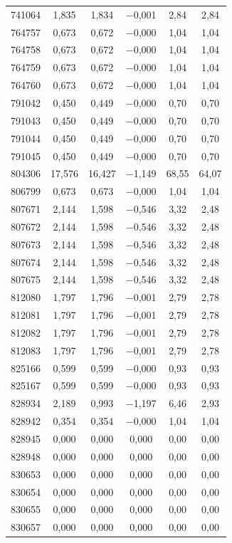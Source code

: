 \begin{longtable}{lccccc}
741064 & 1,835 & 1,834 & $-$0,001 & 2,84 & 2,84 \\
764757 & 0,673 & 0,672 & $-$0,000 & 1,04 & 1,04 \\
764758 & 0,673 & 0,672 & $-$0,000 & 1,04 & 1,04 \\
764759 & 0,673 & 0,672 & $-$0,000 & 1,04 & 1,04 \\
764760 & 0,673 & 0,672 & $-$0,000 & 1,04 & 1,04 \\
791042 & 0,450 & 0,449 & $-$0,000 & 0,70 & 0,70 \\
791043 & 0,450 & 0,449 & $-$0,000 & 0,70 & 0,70 \\
791044 & 0,450 & 0,449 & $-$0,000 & 0,70 & 0,70 \\
791045 & 0,450 & 0,449 & $-$0,000 & 0,70 & 0,70 \\
804306 & 17,576 & 16,427 & $-$1,149 & 68,55 & 64,07 \\
806799 & 0,673 & 0,673 & $-$0,000 & 1,04 & 1,04 \\
807671 & 2,144 & 1,598 & $-$0,546 & 3,32 & 2,48 \\
807672 & 2,144 & 1,598 & $-$0,546 & 3,32 & 2,48 \\
807673 & 2,144 & 1,598 & $-$0,546 & 3,32 & 2,48 \\
807674 & 2,144 & 1,598 & $-$0,546 & 3,32 & 2,48 \\
807675 & 2,144 & 1,598 & $-$0,546 & 3,32 & 2,48 \\
812080 & 1,797 & 1,796 & $-$0,001 & 2,79 & 2,78 \\
812081 & 1,797 & 1,796 & $-$0,001 & 2,79 & 2,78 \\
812082 & 1,797 & 1,796 & $-$0,001 & 2,79 & 2,78 \\
812083 & 1,797 & 1,796 & $-$0,001 & 2,79 & 2,78 \\
825166 & 0,599 & 0,599 & $-$0,000 & 0,93 & 0,93 \\
825167 & 0,599 & 0,599 & $-$0,000 & 0,93 & 0,93 \\
828934 & 2,189 & 0,993 & $-$1,197 & 6,46 & 2,93 \\
828942 & 0,354 & 0,354 & $-$0,000 & 1,04 & 1,04 \\
828945 & 0,000 & 0,000 & 0,000 & 0,00 & 0,00 \\
828948 & 0,000 & 0,000 & 0,000 & 0,00 & 0,00 \\
830653 & 0,000 & 0,000 & 0,000 & 0,00 & 0,00 \\
830654 & 0,000 & 0,000 & 0,000 & 0,00 & 0,00 \\
830655 & 0,000 & 0,000 & 0,000 & 0,00 & 0,00 \\
830657 & 0,000 & 0,000 & 0,000 & 0,00 & 0,00 \\
\end{longtable}
\endgroup
